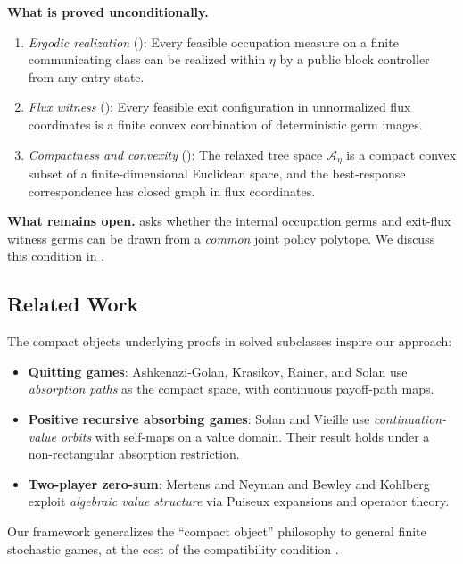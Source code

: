 \documentclass[12pt,a4paper]{article}
\theoremstyle{definition}
\begin{document}
\noindent \textbf{What is proved unconditionally.}
\begin{enumerate}[label=(\roman*)]
\item \emph{Ergodic realization} (): Every feasible occupation measure on a finite communicating class can be realized within $\eta$ by a public block controller from any entry state.
\item \emph{Flux witness} (): Every feasible exit configuration in unnormalized flux coordinates is a finite convex combination of deterministic germ images.
\item \emph{Compactness and convexity} (): The relaxed tree space $\mathcal{A}_\eta$ is a compact convex subset of a finite-dimensional Euclidean space, and the best-response correspondence has closed graph in flux coordinates.
\end{enumerate}

\noindent \textbf{What remains open.}   asks whether the internal occupation germs and exit-flux witness germs can be drawn from a \emph{common} joint policy polytope.  We discuss this condition in .

\subsection{Related Work}

The compact objects underlying proofs in solved subclasses inspire our approach:
\begin{itemize}
\item \textbf{Quitting games}: Ashkenazi-Golan, Krasikov, Rainer, and Solan \cite{AshkenaziGolan2024} use \emph{absorption paths} as the compact space, with continuous payoff-path maps.
\item \textbf{Positive recursive absorbing games}: Solan and Vieille \cite{SolanVieille2025} use \emph{continuation-value orbits} with self-maps on a value domain.  Their result holds under a non-rectangular absorption restriction.
\item \textbf{Two-player zero-sum}: Mertens and Neyman \cite{MertensNeyman1981} and Bewley and Kohlberg \cite{BewleyKohlberg1976} exploit \emph{algebraic value structure} via Puiseux expansions and operator theory.
\end{itemize}

Our framework generalizes the ``compact object'' philosophy to general finite stochastic games, at the cost of the compatibility condition .
\end{document}
